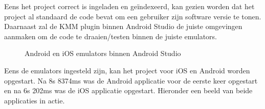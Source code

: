 Eens het project correct is ingeladen en geïndexeerd, kan gezien worden dat het project al standaard de code bevat om een gebruiker zijn software versie te tonen. Daarnaast zal de KMM plugin binnen Android Studio de juiste omgevingen aanmaken om de code te draaien/testen binnen de juiste emulators. 

\begin{figure}
    \centering
    
    
    \caption{Android en iOS emulators binnen Android Studio}
    \label{fig:M-as-emulators}
\end{figure}

Eens de emulators ingesteld zijn, kan het project voor iOS en Android worden opgestart. Na 8s 8374ms was de Android applicatie voor de eerste keer opgestart en na 6s 202ms was de iOS applicatie opgestart. Hieronder een beeld van beide applicaties in actie.

